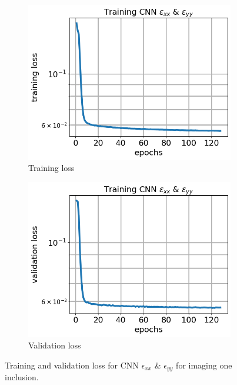 \documentclass[12pt]{article}
\newcommand{\nhgfigheight}{4.0cm}
\begin{document}
\begin{figure}[h]
  \centering
  \begin{subfigure}[b]{0.45\linewidth}
    \includegraphics[totalheight=\nhgfigheight]{Figures/final1/training/exxeyy/field_strainxxyy_plot_loss.png}
    \caption{Training loss}
  \end{subfigure}
  \begin{subfigure}[b]{0.45\linewidth}
    \includegraphics[totalheight=\nhgfigheight]{Figures/final1/training/exxeyy/field_strainxxyy_plot_val_loss.png}
    \caption{Validation loss}
  \end{subfigure}
\caption{\label{fig:oneinc:trainexxeyy} Training and validation loss for CNN $\epsilon_{xx}$ \& $\epsilon_{yy}$ for imaging one inclusion.}
\end{figure}
\end{document}
